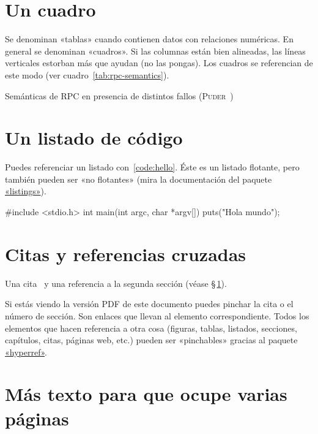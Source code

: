 \section{Un cuadro}
\label{sec:uncuadro}

Se denominan «tablas» cuando contienen datos con relaciones numéricas. En
general se denominan «cuadros». Si las columnas están bien alineadas, las líneas
verticales estorban más que ayudan (no las pongas). Los cuadros se referencian
de este modo (ver cuadro~\ref{tab:rpc-semantics}).

\begin{table}[htbp]
  \centering
  {\small
  
  }
  \caption[Semánticas de \acs{RPC} en presencia de distintos fallos]
  {Semánticas de \acs{RPC} en presencia de distintos fallos
    (\textsc{Puder}~\cite{puder05:_distr_system_archit})}
  \label{tab:rpc-semantics}
\end{table}


\section{Un listado de código}
\label{sec:listado}

Puedes referenciar un listado con~\ref{code:hello}. Éste es un listado flotante,
pero también pueden ser «no flotantes» (mira la documentación del paquete
\href{http://www.ctan.org/get/macros/latex/contrib/listings/listings.pdf}{«listings»}).

\begin{listing}[
  float,
  language = C,
  caption  = {Hola mundo en C},
  label    = code:hello]
#include <stdio.h>
int main(int argc, char *argv[]) {
    puts("Hola mundo\n");
}
\end{listing}




\section{Citas y referencias cruzadas}

Una cita~\cite{design_patterns} y una referencia a la segunda sección (véase
\S\,\ref{sec:uncuadro}).

Si estás viendo la versión PDF de este documento puedes pinchar la cita o el
número de sección. Son enlaces que llevan al elemento correspondiente. Todos los
elementos que hacen referencia a otra cosa (figuras, tablas, listados,
secciones, capítulos, citas, páginas web, etc.) pueden ser «pinchables» gracias al
paquete \href{http://latex.tugraz.at/_media/docs/hyperref.pdf}{«hyperref»}.



\section{Más texto para que ocupe varias páginas}





